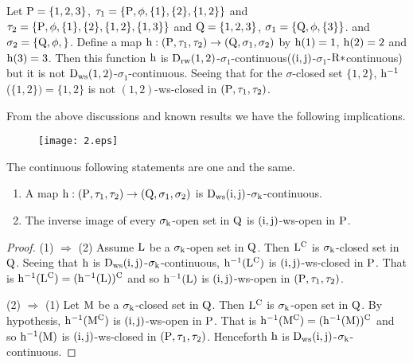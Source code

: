 \begin{exm}\label{exam7.4.25}
Let $\mathrm{P}=\{1,2,3\}$, $\tau_1 =\{\mathrm{P}, \phi, \{1\}, \{2\}, \{1,2\}\}$ and $\tau_2 =\{\TSP, \phi, \{1\},\break \{2\},\{1,2\},\{1,3\}\}$ and $\mathrm{Q}=\{1,2,3\}$, $\sigma_{1} =\{\mathrm{Q}, \phi, \{3\}\}$. and $\sigma_{2} =\{\mathrm{Q}, \phi, \}$. Define a map $\mathrm{h}:(\mathrm{P}, \tau_1, \tau_2 )\to (\mathrm{Q}, \sigma_{1}, \sigma_{2} )$ by $\mathrm{h}(1)=1$, $\mathrm{h}(2)=2$ and $\mathrm{h}(3)=3$. Then this function $\mathrm{h}$ is $\mathrm{D}_{\mathrm{rw}} (1, 2)$-$\sigma_{1}$-continuous($(\mathrm{i}, \mathrm{j})$-$\sigma_{1}$-$\mathrm{R}*$continuous) but it is not $\mathrm{D}_{\mathrm{ws}} (1, 2)$-$\sigma_{1}$-continuous. Seeing that for the $\sigma$-closed set $\{1,2\}$, $\mathrm{h}^{-1}$ ($\{1,2\})=\{1,2\}$ is not $(1, 2)$-ws-closed in $(\mathrm{P}, \tau_1, \tau_2 )$.
\end{exm}

\begin{rem}\label{rem7.4.26}
From the above discussions and known results we have the following implications.
\begin{figure}[H]
\centering
\texttt{[image: 2.eps]}
\end{figure}
\end{rem}

\begin{thm}\label{thm7.4.28}
The continuous following statements are one and the same.
\begin{enumerate}[(1)]
\item A map $\mathrm{h}:(\mathrm{P}, \tau_1, \tau_2 )\to (\mathrm{Q}, \sigma_{1}, \sigma_{2} )$ is $\mathrm{D}_{\mathrm{ws}} (\mathrm{i}, \mathrm{j})$-$\sigma_{\mathrm{k}}$-continuous.

\item The inverse image of every $\sigma_{\mathrm{k}}$-open set in $\mathrm{Q}$ is $(\mathrm{i}, \mathrm{j})$-ws-open in $\mathrm{P}$.
\end{enumerate}
\end{thm}

\begin{proof}
(1) $\Rightarrow$  (2) Assume $\mathrm{L}$ be a $\sigma_{\mathrm{k}}$-open set in $\mathrm{Q}$. Then $\mathrm{L}^{\text{C}}$ is $\sigma_{\mathrm{k}}$-closed set in $\mathrm{Q}$. Seeing that $\mathrm{h}$ is $\mathrm{D}_{\mathrm{ws}}(\mathrm{i}, \mathrm{j})$-$\sigma_{\mathrm{k}}$-continuous, $\mathrm{h}^{-1} (\mathrm{L}^{\text{C}})$ is $(\mathrm{i}, \mathrm{j})$-ws-closed in $\mathrm{P}$. That is $\mathrm{h}^{-1} (\mathrm{L}^{\text{C}})=(\mathrm{h}^{-1} (\mathrm{L}))^{\text{C}}$ and so $\mathrm{h}^{-1} (\mathrm{L})$ is $(\mathrm{i}, \mathrm{j})$-ws-open in $(\mathrm{P}, \tau_1, \tau_2 )$.

(2) $\Rightarrow$  (1) Let $\mathrm{M}$ be a $\sigma_{\mathrm{k}}$-closed set in $\mathrm{Q}$. Then $\mathrm{L}^{\text{C}}$ is $\sigma_{\mathrm{k}}$-open set in $\mathrm{Q}$. By hypothesis, $\mathrm{h}^{-1} (\mathrm{M}^{\text{C}})$ is $(\mathrm{i}, \mathrm{j})$-ws-open in $\mathrm{P}$. That is $\mathrm{h}^{-1} (\mathrm{M}^{\text{C}}) = (\mathrm{h}^{-1} (\mathrm{M}))^{\text{C}}$ and so $\mathrm{h}^{-1} (\mathrm{M})$ is $(\mathrm{i}, \mathrm{j})$-ws-closed in $(\mathrm{P}, \tau_1, \tau_2 )$. Henceforth $\mathrm{h}$ is $\mathrm{D}_{\mathrm{ws}}(\mathrm{i}, \mathrm{j})$-$\sigma_{\mathrm{k}}$-continuous.
\end{proof}

